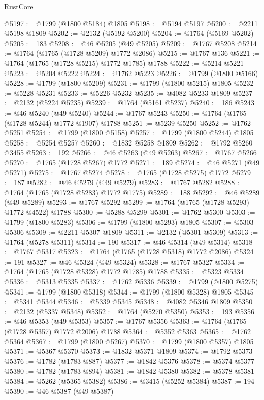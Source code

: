 \begin{lexlean}{RustCore}
\begin{coremodule}
@5197 := @1799 (@1800 @5184) @1805
@5198 := @5194 @5197
@5200 := @2211 @5198 @1809
@5202 := @2132 (@5192 @5200)
@5204 := @1764 (@5169 @5202)
@5205 := 183
@5208 := @46 @5205 (@49 @5205)
@5209 := @1767 @5208
@5214 := @1764 (@1765 (@1728 @5209) @1772 @2086)
@5215 := @1767 @136
@5221 := @1764 (@1765 (@1728 @5215) @1772 @1785) @1788
@5222 := @5214 @5221
@5223 := @5204 @5222
@5224 := @1762 @5223
@5226 := @1799 (@1800 @5166)
@5228 := @1799 (@1800 @5209)
@5231 := @1799 (@1800 @5215) @1805
@5232 := @5228 @5231
@5233 := @5226 @5232
@5235 := @4082 @5233 @1809
@5237 := @2132 (@5224 @5235)
@5239 := @1764 (@5161 @5237)
@5240 := 186
@5243 := @46 @5240 (@49 @5240)
@5244 := @1767 @5243
@5250 := @1764 (@1765 (@1728 @5244) @1772 @1907) @1788
@5251 := @5239 @5250
@5252 := @1762 @5251
@5254 := @1799 (@1800 @5158)
@5257 := @1799 (@1800 @5244) @1805
@5258 := @5254 @5257
@5260 := @1832 @5258 @1809
@5262 := @1792 @5260 @3455
@5263 := 192
@5266 := @46 @5263 (@49 @5263)
@5267 := @1767 @5266
@5270 := @1765 (@1728 @5267) @1772
@5271 := 189
@5274 := @46 @5271 (@49 @5271)
@5275 := @1767 @5274
@5278 := @1765 (@1728 @5275) @1772
@5279 := 187
@5282 := @46 @5279 (@49 @5279)
@5283 := @1767 @5282
@5288 := @1764 (@1765 (@1728 @5283) @1772 @1775)
@5289 := 188
@5292 := @46 @5289 (@49 @5289)
@5293 := @1767 @5292
@5299 := @1764 (@1765 (@1728 @5293) @1772 @4522) @1788
@5300 := @5288 @5299
@5301 := @1762 @5300
@5303 := @1799 (@1800 @5283)
@5306 := @1799 (@1800 @5293) @1805
@5307 := @5303 @5306
@5309 := @2211 @5307 @1809
@5311 := @2132 (@5301 @5309)
@5313 := @1764 (@5278 @5311)
@5314 := 190
@5317 := @46 @5314 (@49 @5314)
@5318 := @1767 @5317
@5323 := @1764 (@1765 (@1728 @5318) @1772 @2086)
@5324 := 191
@5327 := @46 @5324 (@49 @5324)
@5328 := @1767 @5327
@5334 := @1764 (@1765 (@1728 @5328) @1772 @1785) @1788
@5335 := @5323 @5334
@5336 := @5313 @5335
@5337 := @1762 @5336
@5339 := @1799 (@1800 @5275)
@5341 := @1799 (@1800 @5318)
@5344 := @1799 (@1800 @5328) @1805
@5345 := @5341 @5344
@5346 := @5339 @5345
@5348 := @4082 @5346 @1809
@5350 := @2132 (@5337 @5348)
@5352 := @1764 (@5270 @5350)
@5353 := 193
@5356 := @46 @5353 (@49 @5353)
@5357 := @1767 @5356
@5363 := @1764 (@1765 (@1728 @5357) @1772 @2006) @1788
@5364 := @5352 @5363
@5365 := @1762 @5364
@5367 := @1799 (@1800 @5267)
@5370 := @1799 (@1800 @5357) @1805
@5371 := @5367 @5370
@5373 := @1832 @5371 @1809
@5374 := @1792 @5373
@5376 := @1782 (@1783 @887)
@5377 := @1842 @5376
@5378 := @5374 @5377
@5380 := @1782 (@1783 @894)
@5381 := @1842 @5380
@5382 := @5378 @5381
@5384 := @5262 (@5365 @5382)
@5386 := @3415 (@5252 @5384)
@5387 := 194
@5390 := @46 @5387 (@49 @5387)

\end{coremodule}
\end{lexlean}
